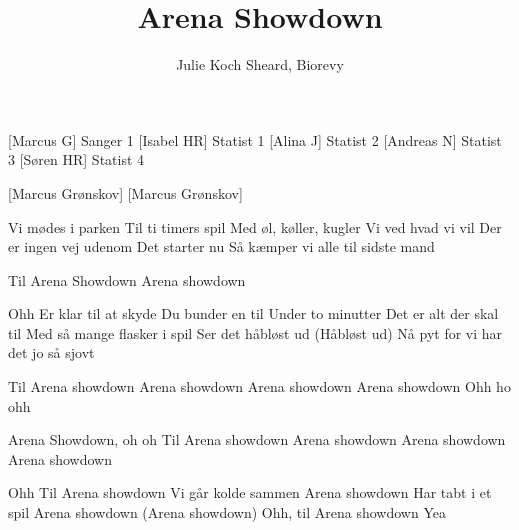\documentclass[a4paper,12pt]{article}
\title{Arena Showdown}
\author{Julie Koch Sheard, Biorevy}
\begin{document}
\maketitle

\begin{texxers}
\end{texxers}

\begin{roles}
	[Marcus G] Sanger 1
	[Isabel HR] Statist 1
	[Alina J] Statist 2
	[Andreas N] Statist 3
	[Søren HR] Statist 4
\end{roles}


\begin{props}
	[Marcus Grønskov]
	[Marcus Grønskov]
\end{props}

\begin{song}
Vi mødes i parken
Til ti timers spil
Med øl, køller, kugler
Vi ved hvad vi vil
Der er ingen vej udenom
Det starter nu
Så kæmper vi alle til sidste mand

Til Arena Showdown
Arena showdown

Ohh
Er klar til at skyde
Du bunder en til
Under to minutter
Det er alt der skal til
Med så mange flasker i spil
Ser det håbløst ud (Håbløst ud)
Nå pyt for vi har det jo så sjovt

Til Arena showdown
Arena showdown
Arena showdown
Arena showdown
Ohh ho ohh

Arena Showdown, oh oh
Til Arena showdown
Arena showdown
Arena showdown
Arena showdown

Ohh
Til Arena showdown
Vi går kolde sammen
Arena showdown
Har tabt i et spil
Arena showdown
(Arena showdown)
Ohh, til Arena showdown
Yea



\end{song}
\end{document}
